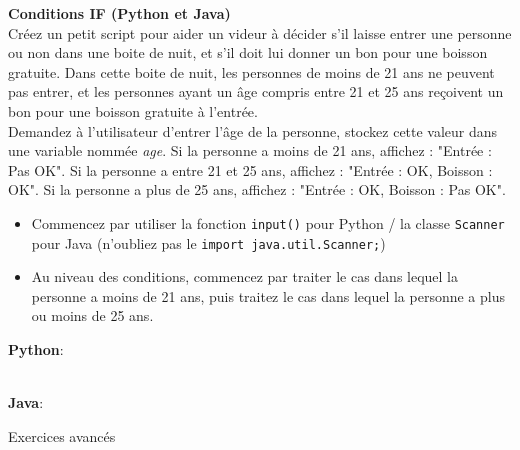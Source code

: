 \begin{Exercice}[5 minutes] \textbf{Conditions IF (Python et Java)}\\
  Créez un petit script pour aider un videur à décider s'il laisse entrer une personne ou non dans une boite de nuit, et s'il doit lui donner un bon pour une boisson gratuite. Dans cette boite de nuit, les personnes de moins de 21 ans ne peuvent pas entrer, et les personnes ayant un âge compris entre 21 et 25 ans reçoivent un bon pour une boisson gratuite à l'entrée. \\
  
Demandez à l'utilisateur d'entrer l'âge de la personne, stockez cette valeur dans une variable nommée \textit{age}. Si la personne a moins de 21 ans, affichez : "Entrée : Pas OK". Si la personne a entre 21 et 25 ans, affichez : "Entrée : OK, Boisson : OK". Si la personne a plus de 25 ans, affichez : "Entrée : OK, Boisson : Pas OK".
   
    \begin{conseil}
      	\begin{itemize}
      	\item Commencez par utiliser la fonction \lstinline{input()} pour Python / la classe \lstinline{Scanner} pour Java (n'oubliez pas le \lstinline{import java.util.Scanner;})
      	\item Au niveau des conditions, commencez par traiter le cas dans lequel la personne a moins de 21 ans, puis traitez le cas dans lequel la personne a plus ou moins de 25 ans.
      	\end{itemize}
    \end{conseil}
    \begin{solution}
    
   \textbf{Python}:
        
        
        \textbf{\\Java}:
        
           
    \end{solution}   
\end{Exercice}

Exercices avancés 
\newpage
